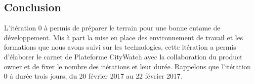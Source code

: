 \subsection{Conclusion}
L’itération 0 à permis de préparer le terrain pour une bonne entame de
développement. Mis à part la mise en place des environnement de travail et les
formations que nous avons suivi sur les technologies, cette itération a permis d’élaborer
le carnet de Plateforme CityWatch avec la collaboration du product owner et de fixer le
nombre des itérations et leur durée. Rappelons que l’itération 0 à durée trois jours,
du 20 février 2017 au 22 février 2017.